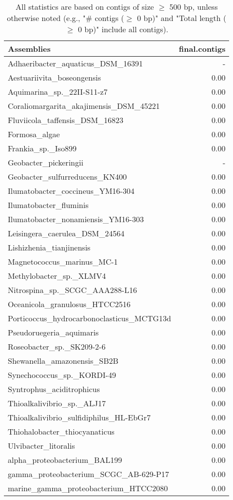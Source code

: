 \documentclass[12pt,a4paper]{article}
\begin{document}
\begin{table}[ht]
\begin{center}
\caption{All statistics are based on contigs of size $\geq$ 500 bp, unless otherwise noted (e.g., "\# contigs ($\geq$ 0 bp)" and "Total length ($\geq$ 0 bp)" include all contigs).}
\begin{tabular}{|l*{1}{|r}|}
\hline
Assemblies & final.contigs \\ \hline
Adhaeribacter\_aquaticus\_DSM\_16391 & - \\ \hline
Aestuariivita\_boseongensis & 0.00 \\ \hline
Aquimarina\_sp.\_22II-S11-z7 & 0.00 \\ \hline
Coraliomargarita\_akajimensis\_DSM\_45221 & 0.00 \\ \hline
Fluviicola\_taffensis\_DSM\_16823 & 0.00 \\ \hline
Formosa\_algae & 0.00 \\ \hline
Frankia\_sp.\_Iso899 & 0.00 \\ \hline
Geobacter\_pickeringii & - \\ \hline
Geobacter\_sulfurreducens\_KN400 & 0.00 \\ \hline
Ilumatobacter\_coccineus\_YM16-304 & 0.00 \\ \hline
Ilumatobacter\_fluminis & 0.00 \\ \hline
Ilumatobacter\_nonamiensis\_YM16-303 & 0.00 \\ \hline
Leisingera\_caerulea\_DSM\_24564 & 0.00 \\ \hline
Lishizhenia\_tianjinensis & 0.00 \\ \hline
Magnetococcus\_marinus\_MC-1 & 0.00 \\ \hline
Methylobacter\_sp.\_XLMV4 & 0.00 \\ \hline
Nitrospina\_sp.\_SCGC\_AAA288-L16 & 0.00 \\ \hline
Oceanicola\_granulosus\_HTCC2516 & 0.00 \\ \hline
Porticoccus\_hydrocarbonoclasticus\_MCTG13d & 0.00 \\ \hline
Pseudoruegeria\_aquimaris & 0.00 \\ \hline
Roseobacter\_sp.\_SK209-2-6 & 0.00 \\ \hline
Shewanella\_amazonensis\_SB2B & 0.00 \\ \hline
Synechococcus\_sp.\_KORDI-49 & 0.00 \\ \hline
Syntrophus\_aciditrophicus & 0.00 \\ \hline
Thioalkalivibrio\_sp.\_ALJ17 & 0.00 \\ \hline
Thioalkalivibrio\_sulfidiphilus\_HL-EbGr7 & 0.00 \\ \hline
Thiohalobacter\_thiocyanaticus & 0.00 \\ \hline
Ulvibacter\_litoralis & 0.00 \\ \hline
alpha\_proteobacterium\_BAL199 & 0.00 \\ \hline
gamma\_proteobacterium\_SCGC\_AB-629-P17 & 0.00 \\ \hline
marine\_gamma\_proteobacterium\_HTCC2080 & 0.00 \\ \hline
\end{tabular}
\end{center}
\end{table}
\end{document}
